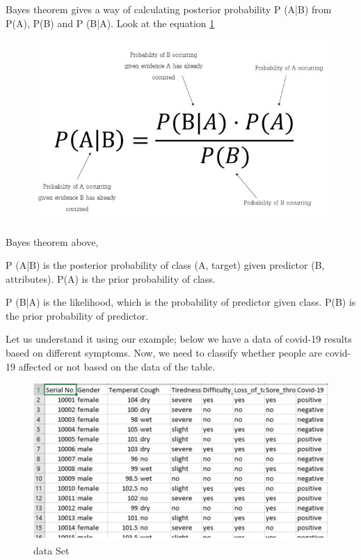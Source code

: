 \documentclass[conference]{IEEEtran}
\begin{document}
Bayes theorem gives a way of calculating posterior probability P (A|B) from P(A), P(B) and P (B|A). Look at the equation \ref{fig:like}



 \begin{figure}[h!]
    \centering
    \includegraphics[scale=0.4]{like.jpg}
    \caption{}
    \label{fig:like}
\end{figure}



Bayes theorem above,


P (A|B) is the posterior probability of class (A, target) given predictor (B, attributes).
P(A) is the prior probability of class.

P (B|A) is the likelihood, which is the probability of predictor given class.
P(B) is the prior probability of predictor.

Let us understand it using our example; below we have a data of covid-19 results based on different symptoms. Now, we need to classify whether people are covid-19 affected or not based on the data of the table.

\begin{figure}[h!]
    \centering
    \includegraphics[scale=0.5]{data.PNG}
    \caption{data Set}
    \label{fig:data}
\end{figure}
\end{document}
